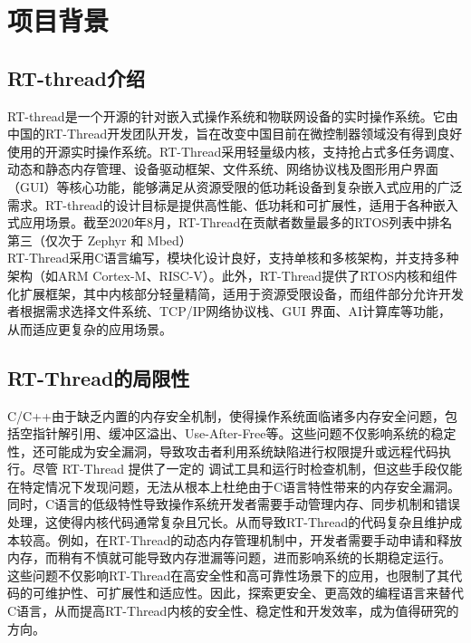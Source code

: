 
\section{项目背景}
\subsection{RT-thread介绍}
\indent RT-thread是一个开源的针对嵌入式操作系统和物联网设备的实时操作系统\cite{Wikipedia_2023b}。它由中国的RT-Thread开发团队开发，旨在改变中国目前在微控制器领域没有得到良好使用的开源实时操作系统。RT-Thread采用轻量级内核，支持抢占式多任务调度、动态和静态内存管理、设备驱动框架、文件系统、网络协议栈及图形用户界面（GUI）等核心功能，能够满足从资源受限的低功耗设备到复杂嵌入式应用的广泛需求。RT-thread的设计目标是提供高性能、低功耗和可扩展性，适用于各种嵌入式应用场景。截至2020年8月，RT-Thread在贡献者数量最多的RTOS列表中排名第三（仅次于 Zephyr 和 Mbed）\\
\indent RT-Thread采用C语言编写，模块化设计良好，支持单核和多核架构，并支持多种架构（如ARM Cortex-M、RISC-V）。此外，RT-Thread提供了RTOS内核和组件化扩展框架，其中内核部分轻量精简，适用于资源受限设备，而组件部分允许开发者根据需求选择文件系统、TCP/IP网络协议栈、GUI 界面、AI计算库等功能，从而适应更复杂的应用场景。\\
\subsection{RT-Thread的局限性}
\indent C/C++由于缺乏内置的内存安全机制，使得操作系统面临诸多内存安全问题，包括空指针解引用、缓冲区溢出、Use-After-Free等\cite{2023rust}。这些问题不仅影响系统的稳定性，还可能成为安全漏洞，导致攻击者利用系统缺陷进行权限提升或远程代码执行。尽管 RT-Thread 提供了一定的 调试工具和运行时检查机制，但这些手段仅能在特定情况下发现问题，无法从根本上杜绝由于C语言特性带来的内存安全漏洞。\\
\indent 同时，C语言的低级特性导致操作系统开发者需要手动管理内存、同步机制和错误处理，这使得内核代码通常复杂且冗长。从而导致RT-Thread的代码复杂且维护成本较高。例如，在RT-Thread的动态内存管理机制中，开发者需要手动申请和释放内存，而稍有不慎就可能导致内存泄漏等问题，进而影响系统的长期稳定运行。\\
\indent 这些问题不仅影响RT-Thread在高安全性和高可靠性场景下的应用，也限制了其代码的可维护性、可扩展性和适应性。因此，探索更安全、更高效的编程语言来替代C语言，从而提高RT-Thread内核的安全性、稳定性和开发效率，成为值得研究的方向。\\
